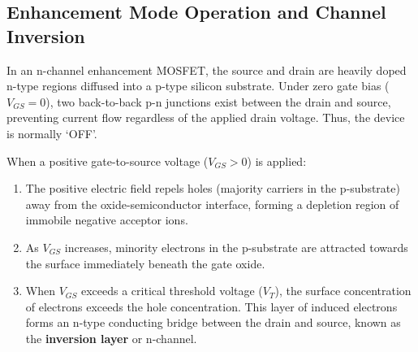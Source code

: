 \documentclass[12pt,a4paper]{article}
\begin{document}
\subsection{Enhancement Mode Operation and Channel Inversion}
In an n-channel enhancement MOSFET, the source and drain are heavily doped n-type regions diffused into a p-type silicon substrate. Under zero gate bias ($V_{GS} = 0$), two back-to-back p-n junctions exist between the drain and source, preventing current flow regardless of the applied drain voltage. Thus, the device is normally `OFF'.

When a positive gate-to-source voltage ($V_{GS} > 0$) is applied:
\begin{enumerate}
    \item The positive electric field repels holes (majority carriers in the p-substrate) away from the oxide-semiconductor interface, forming a depletion region of immobile negative acceptor ions.
    \item As $V_{GS}$ increases, minority electrons in the p-substrate are attracted towards the surface immediately beneath the gate oxide.
    \item When $V_{GS}$ exceeds a critical threshold voltage ($V_T$), the surface concentration of electrons exceeds the hole concentration. This layer of induced electrons forms an n-type conducting bridge between the drain and source, known as the \textbf{inversion layer} or n-channel.
\end{enumerate}
\end{document}
